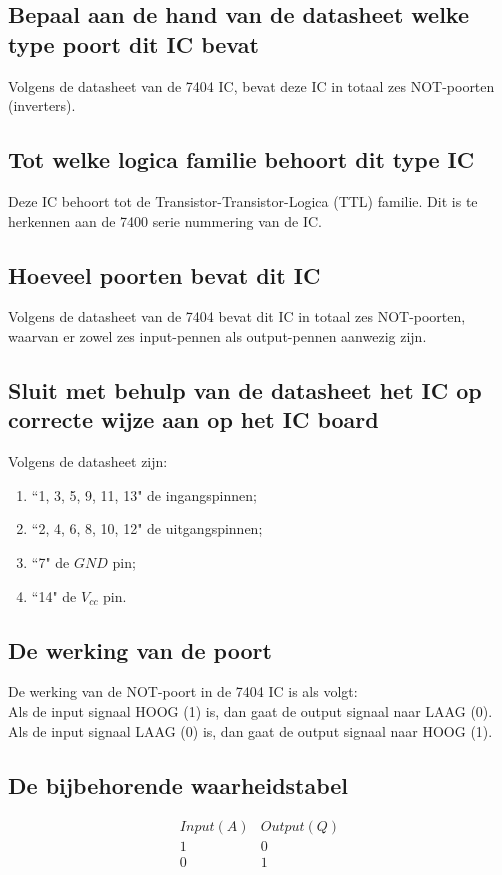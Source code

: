 \documentclass[12pt]{article}
\begin{document}
\pagebreak
\subsection{Bepaal aan de hand van de datasheet welke type poort dit IC bevat}
Volgens de datasheet van de 7404 IC, bevat deze IC in totaal zes NOT-poorten (inverters).

\subsection{Tot welke logica familie behoort dit type IC}
Deze IC behoort tot de Transistor-Transistor-Logica (TTL) familie. Dit is te herkennen aan de 7400 serie nummering van de IC. 

\subsection{Hoeveel poorten bevat dit IC}
Volgens de datasheet van de 7404 bevat dit IC in totaal zes NOT-poorten, waarvan er zowel zes input-pennen als output-pennen aanwezig zijn.

\subsection{Sluit met behulp van de datasheet het IC op correcte wijze aan op het IC board}
Volgens de datasheet zijn:
\begin{enumerate}
    \item ``1, 3, 5, 9, 11, 13" de ingangspinnen;
    \item ``2, 4, 6, 8, 10, 12" de uitgangspinnen;
    \item ``7" de $GND$ pin;
    \item ``14" de $V_{cc}$ pin. 
\end{enumerate}

\subsection{De werking van de poort}
De werking van de NOT-poort in de 7404 IC is als volgt: \\
Als de input signaal HOOG (1) is, dan gaat de output signaal naar LAAG (0).\\ 
Als de input signaal LAAG (0) is, dan gaat de output signaal naar HOOG (1).

\subsection{De bijbehorende waarheidstabel}
\begin{displaymath}
    \begin{array}{|c||c|}
    Input (A) & Output (Q)\\ %
    \hline %
    1 & 0\\
    0 & 1\\
    \end{array}
    \end{displaymath}
\pagebreak
\end{document}
